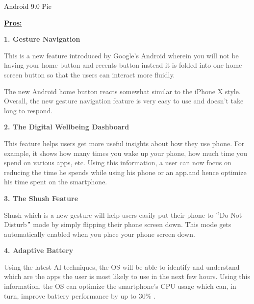 \documentclass[12pt]{article}
\begin{document}
\begin{Center}
{\fontsize{36pt}{43.2pt}\selectfont Android 9.0 Pie\par}
\end{Center}\par

{\fontsize{18pt}{21.6pt}\selectfont \textbf{\uline{Pros:}}\par}\par

\setlength{\parskip}{8.04pt}
\textbf{\textcolor[HTML]{4A4A4A}{1. Gesture Navigation}}\par

\textcolor[HTML]{4A4A4A}{This is a new feature introduced by Google’s Android wherein you will not be having your home button and recents button instead it is folded into one home screen button so that the users can interact more fluidly.}\par

\textcolor[HTML]{4A4A4A}{The new Android home button reacts somewhat similar to the iPhone X style. Overall, the new gesture navigation feature is very easy to use and doesn’t take long to respond.}\par

\textbf{\textcolor[HTML]{4A4A4A}{2. The Digital Wellbeing Dashboard}}\par

\textcolor[HTML]{4A4A4A}{This feature helps users get more useful insights about how they use phone. For example, it shows how many times you wake up your phone, how much time you spend on various apps, etc. Using this information, a user can now focus on reducing the time he spends while using his phone or an app.and hence optimize his time spent on the smartphone.}\par

\textbf{\textcolor[HTML]{4A4A4A}{3. The Shush Feature}}\par

\textcolor[HTML]{4A4A4A}{Shush which is a new gesture will help users easily put their phone to $``$Do Not Disturb$"$  mode by simply flipping their phone screen down. This mode gets automatically enabled when you place your phone screen down.}\par

\textbf{\textcolor[HTML]{4A4A4A}{4. Adaptive Battery}}\par

\textcolor[HTML]{4A4A4A}{Using the latest AI techniques, the OS will be able to identify and understand which are the apps the user is most likely to use in the next few hours. Using this information, the OS can optimize the smartphone’s CPU usage which can, in turn, improve battery performance by up to 30$\%$ .}\par
\end{document}
